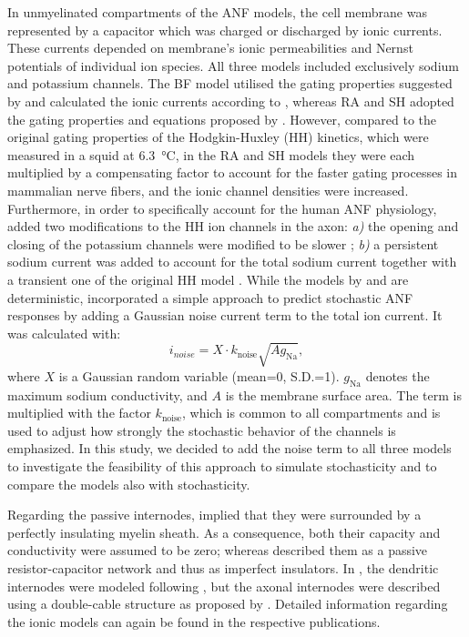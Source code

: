 \documentclass[utf8]{frontiersSCNS} %
\newcommand{\T}[1]{\text{#1}}
\begin{document}
In unmyelinated compartments of the ANF models, the cell membrane was represented by a capacitor which was charged or discharged by ionic currents. These currents depended on membrane's ionic permeabilities and Nernst potentials of individual ion species. All three models included exclusively sodium and potassium channels. The BF model utilised the gating properties suggested by \cite{Schwarz1987} and calculated the ionic currents according to \cite{Frankenhaeuser1964}, whereas RA and SH adopted the gating properties and equations proposed by \cite{Hodgkin1952}. However, compared to the original gating properties of the Hodgkin-Huxley (HH) kinetics, which were measured in a squid at \SI{6.3}{\celsius}, in the RA and SH models they were each multiplied by a compensating factor to account for the faster gating processes in mammalian nerve fibers, and the ionic channel densities were increased. Furthermore, in order to specifically account for the human ANF physiology, \cite{Smit2010} added two modifications to the HH ion channels in the axon: \emph{a)} the opening and closing of the potassium channels were modified to be slower \citep{Smit2008}; \emph{b)} a persistent sodium current was added to account for the total sodium current together with a transient one of the original HH model \citep{Smit2009}. While the models by \cite{Briaire2005} and \cite{Smit2010} are deterministic, \cite{Rattay2001} incorporated a simple approach to predict stochastic ANF responses by adding a Gaussian noise current term to the total ion current. It was calculated with:
\begin{equation}
i_{noise} = X \cdot k_{\T{noise}} \sqrt{A g_{\T{Na}}},
\label{equ:stochasticity_rattay}
\end{equation}
where $X$ is a Gaussian random variable (mean=0, S.D.=1). $g_{\T{Na}}$ denotes the maximum sodium conductivity, and $A$ is the membrane surface area. The term is multiplied with the factor $k_{\T{noise}}$, which is common to all compartments and is used to adjust how strongly the stochastic behavior of the channels is emphasized. In this study, we decided to add the noise term to all three models to investigate the feasibility of this approach to simulate stochasticity and to compare the models also with stochasticity.

Regarding the passive internodes, \cite{Briaire2005} implied that they were surrounded by a perfectly insulating myelin sheath. As a consequence, both their capacity and conductivity were assumed to be zero; whereas \cite{Rattay2001} described them as a passive resistor-capacitor network and thus as imperfect insulators. In \cite{Smit2010}, the dendritic internodes were modeled following \cite{Rattay2001}, but the axonal internodes were described using a double-cable structure as proposed by \cite{Blight1985}. Detailed information regarding the ionic models can again be found in the respective publications.
\end{document}
